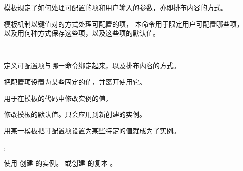 \documentclass{whudoc}
\begin{document}
模板规定了如何处理可配置的项和用户输入的参数，亦即排布内容的方式。
\begin{function}[module=lttemplates]{\DeclareTemplateInterface}
  \begin{syntax}
    \V\DeclareTemplateInterface {}   
  \end{syntax}
\LaTeXe 模板机制以键值对的方式处理可配置的项，
本命令用于限定用户可配置哪些项，以及用何种方式保存这些项，以及这些项的默认值。
\end{function}

\begin{function}[module=lttemplates]{\DeclareTemplateCode}
  \begin{syntax}
    \V\DeclareTemplateCode {}  
    ~~ 
  \end{syntax}
定义可配置项与哪一命令绑定起来，以及排布内容的方式。
\end{function}

\begin{function}[module=lttemplates]{\UseTemplate}
  \begin{syntax}
    \V\UseInstance {}   
  \end{syntax}
把配置项设置为某些固定的值，并离开使用它。
\end{function}

\begin{function}[module=lttemplates]{\SetTemplateKeys}
  \begin{syntax}
    \V\SetTemplateKeys {}  
  \end{syntax}
用于在模板的代码中修改实例的值。
\end{function}

\begin{function}[module=lttemplates]{\EditTemplateDefaults}
  \begin{syntax}
    \V\EditTemplateDefaults {}  
  \end{syntax}
修改模板的默认值。只会应用到新创建的实例。
\end{function}

用某一模板把可配置项设置为某些特定的值就成为了实例。
\begin{function}[module=lttemplates]{\DeclareInstance,\DeclareInstanceCopy}
  \begin{syntax}
    \V\DeclareInstance {}   
    \V\DeclareInstanceCopy {}  
  \end{syntax}
使用  创建  的实例。
或创建  的复本 。
\end{function}
\end{document}
